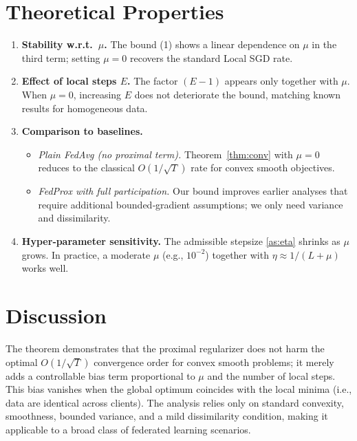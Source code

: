 \documentclass[11pt]{article}
\begin{document}
\section*{Theoretical Properties}
\begin{enumerate}[label=\arabic*.]
\item \textbf{Stability w.r.t.\ $\mu$.}
   The bound (1) shows a linear dependence on $\mu$ in the
   third term; setting $\mu=0$ recovers the standard Local SGD
   rate.
\item \textbf{Effect of local steps $E$.}
   The factor $(E-1)$ appears only together with $\mu$.
   When $\mu=0$, increasing $E$ does not deteriorate the bound,
   matching known results for homogeneous data.
\item \textbf{Comparison to baselines.}
   \begin{itemize}
      \item \emph{Plain FedAvg (no proximal term).}
            Theorem~\ref{thm:conv} with $\mu=0$ reduces to the
            classical $O(1/\sqrt{T})$ rate for convex smooth objectives.
      \item \emph{FedProx with full participation.}
            Our bound improves earlier analyses that require
            additional bounded‑gradient assumptions; we only need
            variance and dissimilarity.
   \end{itemize}
\item \textbf{Hyper‑parameter sensitivity.}
   The admissible stepsize \eqref{as:eta} shrinks as $\mu$ grows.
   In practice, a moderate $\mu$ (e.g., $10^{-2}$) together with
   $\eta\approx 1/(L+\mu)$ works well.
\end{enumerate}

\section*{Discussion}
The theorem demonstrates that the proximal regularizer does not
harm the optimal $O(1/\sqrt{T})$ convergence order for convex smooth
problems; it merely adds a controllable bias term proportional to
$\mu$ and the number of local steps.  This bias vanishes when the
global optimum coincides with the local minima (i.e., data are
identical across clients).  The analysis relies only on standard
convexity, smoothness, bounded variance, and a mild dissimilarity
condition, making it applicable to a broad class of federated
learning scenarios.
\end{document}
